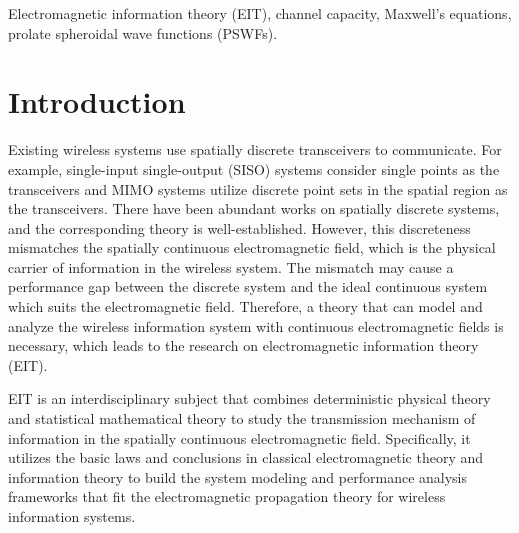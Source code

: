 \documentclass[journal,twocolumn]{IEEEtran}
\begin{document}
\begin{IEEEkeywords}
    Electromagnetic information theory (EIT), channel capacity, Maxwell's equations, prolate spheroidal wave functions (PSWFs). 
\end{IEEEkeywords}

\section{Introduction}
Existing wireless systems use spatially discrete transceivers to communicate. For example, single-input single-output (SISO) systems consider single points as the transceivers and MIMO systems utilize discrete point sets in the spatial region as the transceivers. 
There have been abundant works on spatially discrete systems, and the corresponding theory is well-established. 
However, this discreteness mismatches the spatially continuous electromagnetic field, which is the physical carrier of information in the wireless system. 
The mismatch may cause a performance gap between the discrete system and the ideal continuous system which suits the electromagnetic field. 
Therefore, a theory that can model and analyze the wireless information system with continuous electromagnetic fields is necessary, which leads to the research on electromagnetic information theory (EIT).

EIT is an interdisciplinary subject that combines deterministic physical theory and statistical mathematical theory to study the transmission mechanism of information in the spatially continuous electromagnetic field. 
Specifically, it utilizes the basic laws and conclusions in classical electromagnetic theory and information theory to build the system modeling and performance analysis frameworks that fit the electromagnetic propagation theory for wireless information systems. 
\end{document}
